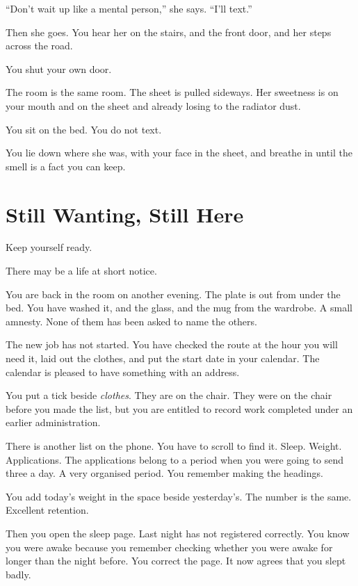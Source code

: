 \documentclass[11pt,oneside]{book}
\begin{document}
``Don't wait up like a mental person,'' she says. ``I'll text.''

Then she goes. You hear her on the stairs, and the front door, and her steps across the road.

You shut your own door.

The room is the same room. The sheet is pulled sideways. Her sweetness is on your mouth and on the sheet and already losing to the radiator dust.

You sit on the bed. You do not text.

You lie down where she was, with your face in the sheet, and breathe in until the smell is a fact you can keep.

\chapter*{Still Wanting, Still Here}

Keep yourself ready.

There may be a life at short notice.

You are back in the room on another evening. The plate is out from under the bed. You have washed it, and the glass, and the mug from the wardrobe. A small amnesty. None of them has been asked to name the others.

The new job has not started. You have checked the route at the hour you will need it, laid out the clothes, and put the start date in your calendar. The calendar is pleased to have something with an address.

You put a tick beside \emph{clothes}. They are on the chair. They were on the chair before you made the list, but you are entitled to record work completed under an earlier administration.

There is another list on the phone. You have to scroll to find it. Sleep. Weight. Applications. The applications belong to a period when you were going to send three a day. A very organised period. You remember making the headings.

You add today's weight in the space beside yesterday's. The number is the same. Excellent retention.

Then you open the sleep page. Last night has not registered correctly. You know you were awake because you remember checking whether you were awake for longer than the night before. You correct the page. It now agrees that you slept badly.
\end{document}
